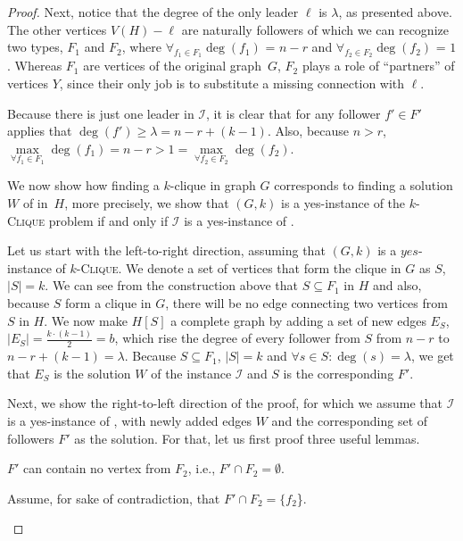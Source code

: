 \begin{proof}
    Next, notice that the degree of the only leader $\ell$ is $\lambda$, as presented above.
    The other vertices $V(H) - \ell$ are naturally followers of which we can recognize two types, $F_1$ and $F_2$,
    where $\forall_{f_1 \in F_1} \deg(f_1)$ = $n-r$ and $\forall_{f_2 \in F_2} \deg(f_2)$ = $1$.
    Whereas $F_1$ are vertices of the original graph~$G$,
    $F_2$ plays a role of ``partners'' of vertices $Y$, since their only job is to substitute a missing connection with $\ell$.

    Because there is just one leader in $\mathcal{I}$, it is clear that for any follower $f' \in F'$ applies that
    $\deg(f') \geq \lambda = n - r + (k - 1)$.
    Also, because $n > r$, $\max\limits_{\forall f_1 \in F_1}\deg(f_1) = n-r > 1 = \max\limits_{\forall f_2 \in F_2}\deg(f_2)$.
    
    We now show how finding a $k$-clique in graph $G$ corresponds to finding a solution $W$ of \HLshort in~$H$, more precisely,
    we show that $(G, k)$ is a yes-instance of the $k$-\textsc{Clique} problem if and only if $\mathcal{I}$ is a yes-instance of \HLdeg.

    Let us start with the left-to-right direction, assuming that $(G, k)$ is a $yes$-instance of $k$-\textsc{Clique}.
    We denote a set of vertices that form the clique in $G$ as $S$, $|S| = k$.
    We can see from the construction above that $S \subseteq F_1$ in $H$ and also, because $S$ form a clique in $G$,
    there will be no edge connecting two vertices from $S$ in $H$.
    We now make $H[S]$ a complete graph by adding a set of new edges $E_S$, $|E_S| = \frac{k\cdot(k-1)}{2} = b$,
    which rise the degree of every follower from $S$ from $n-r$ to $n-r+(k-1) = \lambda$.
    Because $S \subseteq F_1$, $|S| = k$ and $\forall s \in S \colon \deg(s) = \lambda$,
    we get that $E_S$ is the solution $W$ of the \HLshort instance $\mathcal{I}$ and $S$ is the corresponding $F'$. 

    Next, we show the right-to-left direction of the proof, for which we assume that $\mathcal{I}$ is a yes-instance of \HLdeg,
    with newly added edges $W$ and the corresponding set of followers $F'$ as the solution. 
    For that, let us first proof three useful lemmas.

    \begin{lemma}\label{lemmaInProof}
        $F'$ can contain no vertex from $F_2$, i.e., $F' \cap F_2 = \emptyset$.
    \end{lemma}
    \begin{subproof}
        Assume, for sake of contradiction, that $F' \cap F_2 = \{f_2$\}.
        

\end{subproof}
\end{proof}

